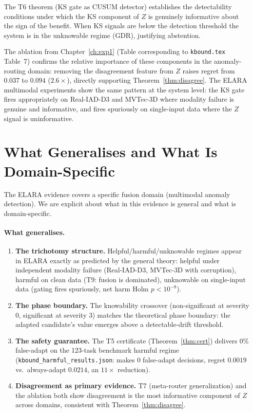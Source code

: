 The T6 theorem (KS gate as CUSUM detector) establishes the detectability conditions
under which the KS component of $Z$ is genuinely informative about the sign of the
benefit.  When KS signals are below the detection threshold the system is in the
unknowable regime (GDR), justifying abstention.

The ablation from Chapter~\ref{ch:exp1} (Table corresponding to \texttt{kbound.tex}
Table~7) confirms the relative importance of these components in the anomaly-routing
domain: removing the disagreement feature from $Z$ raises regret from $0.037$ to
$0.094$ ($2.6{\times}$), directly supporting Theorem~\ref{thm:disagree}.  The
ELARA multimodal experiments show the same pattern at the system level: the KS
gate fires appropriately on Real-IAD-D3 and MVTec-3D where modality failure is
genuine and informative, and fires spuriously on single-input data where the $Z$
signal is uninformative.

\section{What Generalises and What Is Domain-Specific}\label{sec:elara-generalize}

The ELARA evidence covers a specific fusion domain (multimodal anomaly
detection).  We are explicit about what in this evidence is general and what is
domain-specific.

\paragraph{What generalises.}
\begin{enumerate}
\item \textbf{The trichotomy structure.}  Helpful/harmful/unknowable regimes appear
  in ELARA exactly as predicted by the general theory: helpful under independent
  modality failure (Real-IAD-D3, MVTec-3D with corruption), harmful on clean data
  (T9: fusion is dominated), unknowable on single-input data (gating fires
  spuriously, net harm Holm $p{<}10^{-8}$).
\item \textbf{The phase boundary.}  The knowability crossover (non-significant at
  severity 0, significant at severity 3) matches the theoretical phase boundary:
  the adapted candidate's value emerges above a detectable-drift threshold.
\item \textbf{The safety guarantee.}  The T5 certificate (Theorem~\ref{thm:cert})
  delivers $0\%$ false-adapt on the 123-task benchmark harmful regime
  (\texttt{kbound\_harmful\_results.json}: \KGA{} makes 0 false-adapt decisions,
  regret $0.0019$ vs.\ always-adapt $0.0214$, an $11{\times}$ reduction).
\item \textbf{Disagreement as primary evidence.}  T7 (meta-router generalization)
  and the ablation both show disagreement is the most informative component of $Z$
  across domains, consistent with Theorem~\ref{thm:disagree}.
\end{enumerate}

